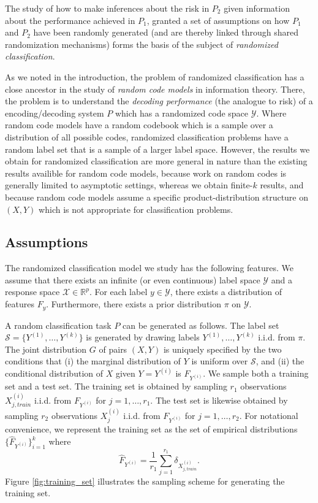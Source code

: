 The study of how to make inferences about the risk in $P_2$ given
information about the performance achieved in $P_1$, granted a set of
assumptions on how $P_1$ and $P_2$ have been randomly generated (and
are thereby linked through shared randomization mechanisms) forms the
basis of the subject of \emph{randomized classification}.

As we noted in the introduction, the problem of randomized
classification has a close ancestor in the study of \emph{random code
  models} in information theory.  There, the problem is to understand
the \emph{decoding performance} (the analogue to risk) of a
encoding/decoding system $P$ which has a randomized code space
$\mathcal{Y}$.  Where random code models have a random codebook which
is a sample over a distribution of all possible codes, randomized
classification problems have a random label set that is a sample of a
larger label space.  However, the results we obtain for randomized
classification are more general in nature than the existing results
availible for random code models, because work on random codes is
generally limited to asymptotic settings, whereas we obtain finite-$k$
results, and because random code models assume a specific
product-distribution structure on $(X, Y)$ which is not appropriate
for classification problems.

\subsection{Assumptions}

The randomized classification model we study has the following
features.  We assume that there exists an infinite (or even
continuous) label space $\mathcal{Y}$ and a response space
$\mathcal{X} \in \mathbb{R}^p$.  For each label $y \in \mathcal{Y}$,
there exists a distribution of features $F_y$.  Furthermore, there
exists a prior distribution $\pi$ on $\mathcal{Y}$.

A random classification task $P$ can be generated as follows.  The
label set $\mathcal{S} = \{Y^{(1)},\hdots, Y^{(k)}\}$ is generated by
drawing labels $Y^{(1)},\hdots, Y^{(k)}$ i.i.d. from $\pi$.  The joint
distribution $G$ of pairs $(X, Y)$ is uniquely specified by the two
conditions that (i) the marginal distribution of $Y$ is uniform over
$\mathcal{S}$, and (ii) the conditional distribution of $X$ given
$Y=Y^{(i)}$ is $F_{Y^{(i)}}$.  We sample both a training set and a
test set.  The training set is obtained by sampling $r_1$ observations
$X_{j, train}^{(i)}$ i.i.d. from $F_{Y^{(i)}}$ for $j = 1,\hdots,
r_1$.  The test set is likewise obtained by sampling $r_2$
observations $X_j^{(i)}$ i.i.d. from $F_{Y^{(i)}}$ for $j = 1,\hdots,
r_2$.  For notational convenience, we represent the training set as
the set of empirical distributions $\{\hat{F}_{Y^{(i)}}\}_{i=1}^k$
where
\[
\hat{F}_{Y^{(i)}} = \frac{1}{r_1} \sum_{j=1}^{r_1} \delta_{X^{(i)}_{j, train}}.
\]
Figure \ref{fig:training_set} illustrates the sampling scheme for
generating the training set.

